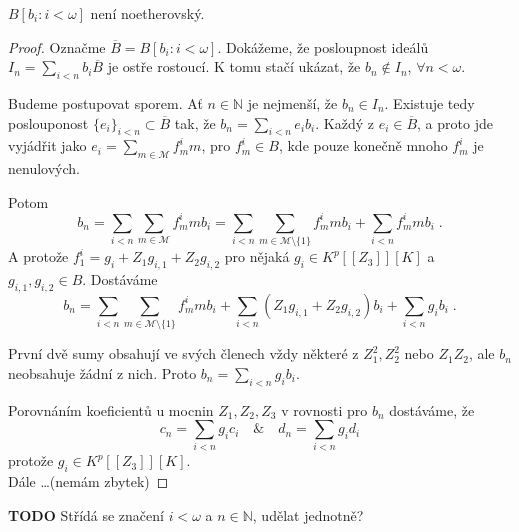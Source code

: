 \documentclass[11pt,a4paper]{article}
\newcommand\m[1]{\mathbb { #1 }} %
\newcommand\p[1]{\mathcal{ #1 }} %
\newcommand\N{\m N}
\theoremstyle{definition}
\theoremstyle{plain}
\begin{document}
\veta $B[b_i : i < \omega]$ není noetherovský.
\begin{proof}
	Označme $\overline{B} = B[b_i : i < \omega]$. Dokážeme, že posloupnost
	ideálů $I_n = \sum_{i < n} b_i \overline{B}$ je ostře rostoucí. K tomu
	stačí ukázat, že $b_n \notin I_n$, $\forall n < \omega$.

	Budeme postupovat sporem. Ať $n \in \N$ je nejmenší, že $b_n \in I_n$.
	Existuje tedy poslouponost $\{e_i\}_{i < n} \subset \overline B$ tak, že
	$b_n = \sum_{i < n} e_i b_i$. Každý z $e_i \in \overline B$, a proto jde
	vyjádřit jako $e_i = \sum_{m \in \p M} f^i_m m$, pro $f^i_m \in B$, kde
	pouze konečně mnoho $f^i_m$ je nenulových.

	Potom
	\[
	b_n = \sum_{i < n} \sum_{m \in \p M} f^i_m m b_i = \sum_{i < n} \sum_{m \in
	\p M \setminus \{1\}} f^i_m m b_i + \sum_{i < n} f^i_m m b_i \;.
	\]
	A protože $f^i_1 = g_i + Z_1 g_{i,1} + Z_2 g_{i,2}$ pro nějaká $g_i \in
	K^p[[Z_3]][K]$ a $g_{i,1}, g_{i,2} \in B$. Dostáváme
	\[
	b_n = \sum_{i < n} \sum_{m \in \p M \setminus \{1\}} f^i_m m b_i +
	\sum_{i<n} \left(Z_1 g_{i,1} + Z_2 g_{i,2}\right)b_i + \sum_{i<n} g_i b_i
	\;.
	\]

	První dvě sumy obsahují ve svých členech vždy některé z $Z_1^2, Z_2^2$ nebo
	$Z_1 Z_2$, ale $b_n$ neobsahuje žádní z nich. Proto $b_n = \sum_{i<n} g_i
	b_i$.

	Porovnáním koeficientů u mocnin $Z_1, Z_2, Z_3$ v rovnosti pro $b_n$
	dostáváme, že
	\[
	c_n = \sum_{i<n} g_i c_i \quad \& \quad d_n = \sum_{i<n} g_i d_i
	\]
	protože $g_i \in K^p[[Z_3]][K]$.
	\\

	Dále \dots (nemám zbytek)
\end{proof}

\textbf{TODO} Střídá se značení $i < \omega$ a $n \in \N$, udělat jednotně?
\end{document}
